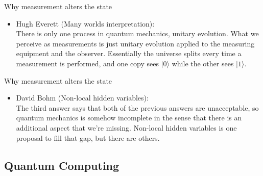     \begin{frame}{Why measurement alters the state}
        \begin{itemize}
            \item Hugh Everett  (Many worlds interpretation):\\
            There is only one process in quantum mechanics, unitary evolution. What we perceive as measurements is just unitary evolution applied to the measuring equipment and the observer. Essentially the universe splits every time a measurement is performed, and one copy sees $|0\rangle$ while the other sees $|1\rangle$.            
        \end{itemize}
    \end{frame}
    \begin{frame}{Why measurement alters the state}
        \begin{itemize}
        
            \item David Bohm  (Non-local hidden variables):\\
            The third answer says that both of the previous answers are unacceptable, so quantum mechanics is somehow incomplete in the sense that there is an additional aspect that we’re missing. Non-local hidden variables is one proposal to ﬁll that gap, but there are others.
        \end{itemize}
    \end{frame}
    \subsection{Quantum Computing}
    
